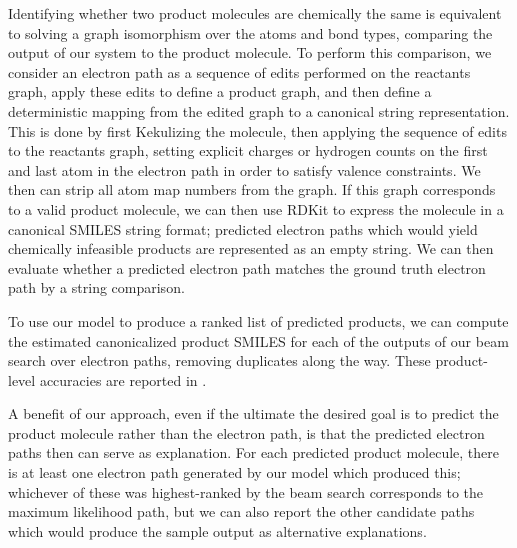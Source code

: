 Identifying whether two product molecules are chemically the same is equivalent to solving a graph isomorphism over the atoms and bond types, comparing the output of our system to the product molecule.
To perform this comparison, we consider an electron path as a sequence of edits performed on the reactants graph, apply these edits to define a product graph, 
and then define a deterministic mapping from the edited graph to a canonical string representation.
This is done by first Kekulizing the molecule, then applying the sequence of edits to the reactants graph,
setting explicit charges or hydrogen counts on the first and last atom in the electron path in order to satisfy valence constraints.
We then can strip all atom map numbers from the graph.
If this graph corresponds to a valid product molecule, we can then use RDKit to express the molecule in a canonical SMILES string format;
predicted electron paths which would yield chemically infeasible products are represented as an empty string.
We can then evaluate whether a predicted electron path matches the ground truth electron path by a string comparison.

To use our model to produce a ranked list of predicted products, we can compute the estimated canonicalized product SMILES for each of the outputs of our beam search over electron paths, removing duplicates along the way. 
These product-level accuracies are reported in .

A benefit of our approach, even if the ultimate the desired goal is to predict the product molecule rather than the electron path,
is that the predicted electron paths then can serve as explanation.
For each predicted product molecule, there is at least one electron path generated by our model which produced this;
whichever of these was highest-ranked by the beam search corresponds to the maximum likelihood path, 
but we can also report the other candidate paths which would produce the sample output as alternative explanations.

